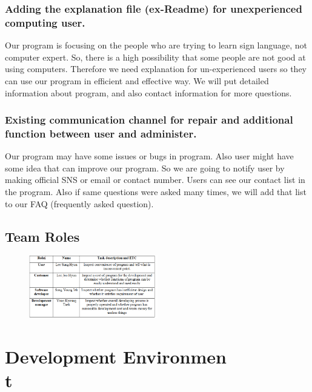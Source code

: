 \documentclass[10pt,journal,compsoc]{IEEEtran}
\begin{document}
\subsubsection{ Adding the explanation file (ex-Readme) for unexperienced computing user.}
Our program is focusing on the people who are trying to learn sign language, not computer expert. So, there is a high possibility that some people are not good at using computers. Therefore we need explanation for un-experienced users so they can use our program in efficient and effective way. We will put detailed information about program, and also contact information for more questions.

\subsubsection{ Existing communication channel for repair and additional function between user and administer.}
Our program may have some issues or bugs in program. Also user might have some idea that can improve our program. So we are going to notify user by making official SNS or email or contact number. Users can see our contact list in the program. Also if same questions were asked many times, we will add that list to our FAQ (frequently asked question).

\subsection{Team Roles}
\begin{figure}[H]
\centering
\includegraphics[width=0.5\textwidth]{names.png}
{\caption*{}}
\end{figure}

\ifCLASSOPTIONcompsoc
{}
\else
\section{Development Environmen\\t}
\label{sec:Development Environment\\}
\fi
\end{document}
